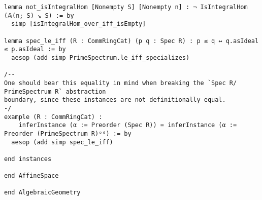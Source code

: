 \documentclass{article}
\begin{document}
\begin{lstlisting}[language=Lean, caption={AffineSpace.lean}]
lemma not_isIntegralHom [Nonempty S] [Nonempty n] : ¬ IsIntegralHom (𝔸(n; S) ↘ S) := by
  simp [isIntegralHom_over_iff_isEmpty]

lemma spec_le_iff (R : CommRingCat) (p q : Spec R) : p ≤ q ↔ q.asIdeal ≤ p.asIdeal := by
  aesop (add simp PrimeSpectrum.le_iff_specializes)

/--
One should bear this equality in mind when breaking the `Spec R/ PrimeSpectrum R` abstraction
boundary, since these instances are not definitionally equal.
-/
example (R : CommRingCat) :
    inferInstance (α := Preorder (Spec R)) = inferInstance (α := Preorder (PrimeSpectrum R)ᵒᵈ) := by
  aesop (add simp spec_le_iff)

end instances

end AffineSpace

end AlgebraicGeometry

\end{lstlisting}
\end{document}
